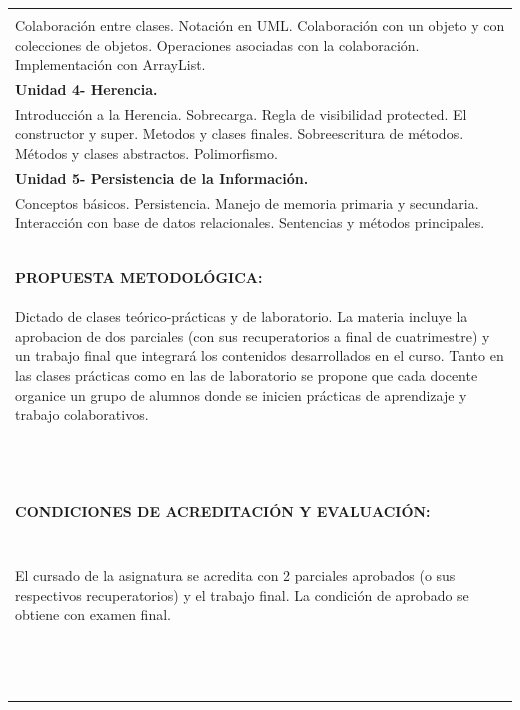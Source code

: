 \documentclass[11pt]{article}
\begin{document}
\begin{center}
\begin{longtable}{|l|}
\begin{minipage}[t]{6.5in}
\textbf{Unidad 3- Herencia.} \\
Colaboración entre clases. Notación en UML. Colaboración con un objeto y con colecciones de objetos. Operaciones asociadas con la
colaboración. Implementación con ArrayList. \\

\textbf{Unidad 4- Herencia.} \\
Introducción a la Herencia. Sobrecarga. Regla de visibilidad protected. El constructor y super. Metodos y clases finales.
Sobreescritura de métodos. Métodos y clases abstractos. Polimorfismo.  \\ 

\textbf{Unidad 5- Persistencia de la Información.} \\
Conceptos básicos. Persistencia. Manejo de memoria primaria y secundaria. Interacción con base de datos relacionales. Sentencias y métodos principales.  \\ 


\ \\
\end{minipage}
                 
\                                               \\    \hline                    
\textbf{PROPUESTA METODOLÓGICA:}                 \\ 
 \begin{minipage}[t]{6.5in}  
Dictado de clases teórico-prácticas y de laboratorio. La materia incluye la aprobacion de dos parciales (con sus recuperatorios
a final de cuatrimestre) y un trabajo final que integrará los contenidos desarrollados en el curso.
Tanto en las clases prácticas como en las de laboratorio se propone que cada docente
organice un grupo de alumnos donde se inicien prácticas de aprendizaje y trabajo colaborativos.
\end{minipage}                         
\                                               \\   
 \hline    

\pagebreak
  \hline    

                \ \\
\textbf{CONDICIONES DE ACREDITACIÓN Y EVALUACIÓN:}  \\ 
\ \\
 \begin{minipage}[t]{6.5in}  

El cursado de la asignatura se acredita con 2 parciales aprobados (o sus respectivos recuperatorios) y el trabajo final.
La condición de aprobado se obtiene con examen final.
\end{minipage} 
\ \\                
\                                               \\    \hline      
              

\end{longtable}
\end{center}
\end{document}
